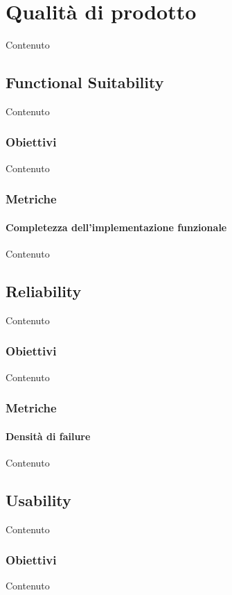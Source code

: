 \section{Qualit\`a di prodotto}
Contenuto

    \subsection{Functional Suitability}
    Contenuto

    \subsubsection{Obiettivi}
    Contenuto


    \subsubsection{Metriche} %

    \paragraph{Completezza dell'implementazione funzionale}
    Contenuto


    \subsection{Reliability}
    Contenuto

    \subsubsection{Obiettivi}
    Contenuto


    \subsubsection{Metriche} %

    \paragraph{Densit\`a di failure}
    Contenuto


    \subsection{Usability}
    Contenuto

    \subsubsection{Obiettivi}
    Contenuto


